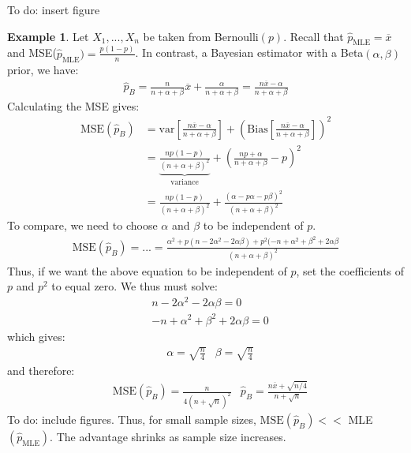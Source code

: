 \documentclass[11pt]{scrartcl}
\theoremstyle{definition}
\newtheorem{ex}{Example}
\theoremstyle{remark}
\begin{document}
To do: insert figure

\begin{ex}
	Let $X_1, ..., X_n$ be taken from Bernoulli$(p)$. Recall that $\hat{p}_{\text{MLE}} = \overline{x}$ and MSE($\hat{p}_{\text{MLE}}) = \frac{p(1-p)}{n}$. In contrast, a Bayesian estimator with a Beta$(\alpha, \beta)$ prior, we have: 
	\begin{align*}
		\hat{p}_B = \frac{n}{n + \alpha + \beta} \overline{x} + \frac{\alpha}{n+ \alpha + \beta}	 = \frac{n \overline{x} - \alpha}{n + \alpha + \beta}	
	\end{align*}
	Calculating the MSE gives: 
	\begin{align*}
		\text{MSE}(\hat{p}_B) & = \text{var} \left[ 	\frac{n \overline{x} - \alpha}{n + \alpha + \beta}		\right] + \left( \text{Bias} \left[ \frac{n \overline{x} - \alpha}{n + \alpha + \beta}	 \right]  \right)^2 \\
		& = \underbrace{\frac{np(1-p)}{(n+ \alpha + \beta)^2}}_{\text{variance}} + \left( 	\frac{np + \alpha}{n + \alpha + \beta} - p	\right)^2 \\
		& = \frac{np(1-p)}{(n + \alpha + \beta)^2} + \frac{(\alpha - p \alpha - p \beta)^2}{(n + \alpha + \beta)^2}
	\end{align*}
	To compare, we need to choose $\alpha$ and $\beta$ to be independent of $p$. 
	\begin{align*}
		\text{MSE}(\hat{p}_B) = ... = \frac{\alpha^ 2 + p(n - 2 \alpha^2 - 2 \alpha \beta) + p^2(-n + \alpha^2 + \beta^2 + 2 \alpha \beta}{(n+ \alpha + \beta)^2}
	\end{align*}
	Thus, if we want the above equation to be independent of $p$, set the coefficients of $p$ and $p^2$ to equal zero. We thus must solve: 
	\begin{align*}
			& n - 2 \alpha^2 - 2 \alpha \beta = 0 \\
			& -n + \alpha^2 + \beta^2 + 2 \alpha \beta = 0
	\end{align*}
	which gives: 
	\begin{align*}
		& \alpha = \sqrt{\frac{n}{4}} & \beta = \sqrt{\frac{n}{4}}
	\end{align*}
	and therefore: 
	\begin{align*}
		& \text{MSE}(\hat{p}_B) = \frac{n}{4(n+ \sqrt{n})^2 }	& \hat{p}_B = \frac{n \overline{x} + \sqrt{n / 4}}{n + \sqrt{n}}
	\end{align*}
	To do: include figures. 
	Thus, for small sample sizes, $\text{MSE}(\hat{p}_B )<< $ MLE$(\hat{p}_{\text{MLE}})$. The advantage shrinks as sample size increases. 
\end{ex}
\end{document}
